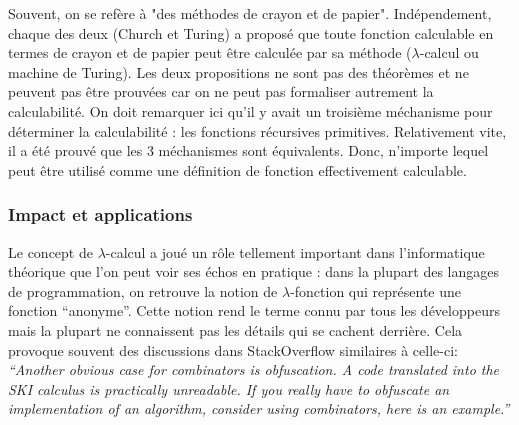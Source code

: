 Souvent, on se refère à "des méthodes de crayon et de papier". Indépendement, chaque des deux (Church et Turing) a proposé que toute fonction calculable en termes de crayon et de papier peut être calculée par sa méthode ($\lambda$-calcul ou machine de Turing). Les deux propositions ne sont pas des théorèmes et ne peuvent pas être prouvées car on ne peut pas formaliser autrement la calculabilité. On doit remarquer ici qu'il y avait un troisième méchanisme pour déterminer la calculabilité : les fonctions récursives primitives. Relativement vite, il a été prouvé que les 3 méchanismes sont équivalents. Donc, n'importe lequel peut être utilisé comme une définition de fonction effectivement calculable.

\subsubsection*{Impact et applications}
Le concept de $\lambda$-calcul a joué un rôle tellement important dans l'informatique théorique que l'on peut voir ses échos en pratique : dans la plupart des langages de programmation, on retrouve la notion de $\lambda$-fonction qui représente une fonction ``anonyme''.
Cette notion rend le terme connu par tous les développeurs mais la plupart ne connaissent pas les détails qui se cachent derrière.
Cela provoque souvent des discussions dans StackOverflow similaires à celle-ci:
\textit{``Another obvious case for combinators is obfuscation. A code translated into the SKI calculus is practically unreadable. If you really have to obfuscate an implementation of an algorithm, consider using combinators, here is an example.''}

